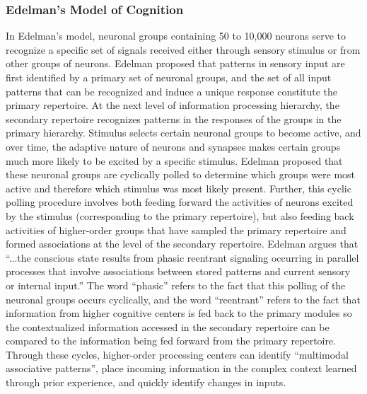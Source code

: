 \subsubsection{Edelman's Model of Cognition}
In Edelman's model, neuronal groups containing 50 to 10,000 neurons serve to recognize a specific set of signals received either through sensory stimulus or from other groups of neurons. Edelman proposed that patterns in sensory input are first identified by a primary set of neuronal groups, and the set of all input patterns that can be recognized and induce a unique response constitute the primary repertoire. At the next level of information processing hierarchy, the secondary repertoire recognizes patterns in the responses of the groups in the primary hierarchy. Stimulus selects certain neuronal groups to become active, and over time, the adaptive nature of neurons and synapses makes certain groups much more likely to be excited by a specific stimulus. Edelman proposed that these neuronal groups are cyclically polled to determine which groups were most active and therefore which stimulus was most likely present. Further, this cyclic polling procedure involves both feeding forward the activities of neurons excited by the stimulus (corresponding to the primary repertoire), but also feeding back activities of higher-order groups that have sampled the primary repertoire and formed associations at the level of the secondary repertoire. Edelman argues that ``...the conscious state results from phasic reentrant signaling occurring in parallel processes that involve associations between stored patterns and current sensory or internal input.'' The word ``phasic'' refers to the fact that this polling of the neuronal groups occurs cyclically, and the word ``reentrant'' refers to the fact that information from higher cognitive centers is fed back to the primary modules so the contextualized information accessed in the secondary repertoire can be compared to the information being fed forward from the primary repertoire. Through these cycles, higher-order processing centers can identify ``multimodal associative patterns'', place incoming information in the complex context learned through prior experience, and quickly identify changes in inputs. 

